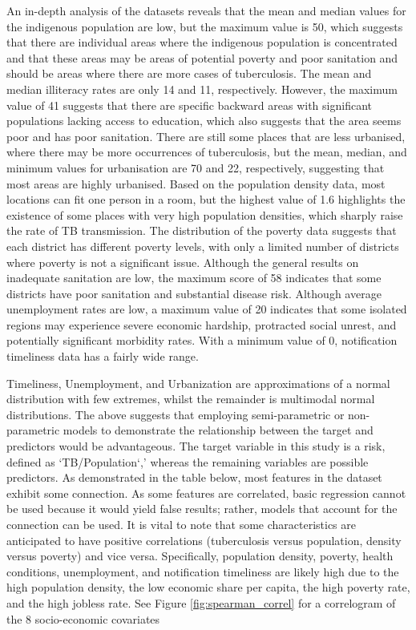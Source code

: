 An in-depth analysis of the datasets reveals that the mean and median values for the indigenous population are low, but the maximum value is 50, which suggests that there are individual areas where the indigenous population is concentrated and that these areas may be areas of potential poverty and poor sanitation and should be areas where there are more cases of tuberculosis. The mean and median illiteracy rates are only 14 and 11, respectively. However, the maximum value of 41 suggests that there are specific backward areas with significant populations lacking access to education, which also suggests that the area seems poor and has poor sanitation. There are still some places that are less urbanised, where there may be more occurrences of tuberculosis, but the mean, median, and minimum values for urbanisation are 70 and 22, respectively, suggesting that most areas are highly urbanised. Based on the population density data, most locations can fit one person in a room, but the highest value of 1.6 highlights the existence of some places with very high population densities, which sharply raise the rate of TB transmission. The distribution of the poverty data suggests that each district has different poverty levels, with only a limited number of districts where poverty is not a significant issue. Although the general results on inadequate sanitation are low, the maximum score of 58 indicates that some districts have poor sanitation and substantial disease risk. Although average unemployment rates are low, a maximum value of 20 indicates that some isolated regions may experience severe economic hardship, protracted social unrest, and potentially significant morbidity rates. With a minimum value of 0, notification timeliness data has a fairly wide range.

Timeliness, Unemployment, and Urbanization are approximations of a normal distribution with few extremes, whilst the remainder is multimodal normal distributions. The above suggests that employing semi-parametric or non-parametric models to demonstrate the relationship between the target and predictors would be advantageous. The target variable in this study is a risk, defined as `TB/Population`,' whereas the remaining variables are possible predictors. As demonstrated in the table below, most features in the dataset exhibit some connection. As some features are correlated, basic regression cannot be used because it would yield false results; rather, models that account for the connection can be used. It is vital to note that some characteristics are anticipated to have positive correlations (tuberculosis versus population, density versus poverty) and vice versa. Specifically, population density, poverty, health conditions, unemployment, and notification timeliness are likely high due to the high population density, the low economic share per capita, the high poverty rate, and the high jobless rate. See Figure \ref{fig:spearman_correl} for a correlogram of the 8 socio-economic covariates



